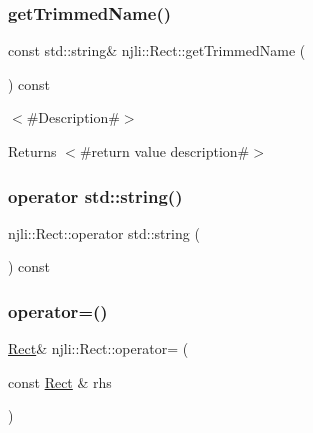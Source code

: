 \mbox{\label{classnjli_1_1_rect_a75997b34f04a294b72534d0c267ceb30}} 
\subsubsection{\texorpdfstring{get\+Trimmed\+Name()}{getTrimmedName()}}
{\footnotesize\ttfamily const std\+::string\& njli\+::\+Rect\+::get\+Trimmed\+Name (\begin{DoxyParamCaption}{ }\end{DoxyParamCaption}) const}

$<$\#\+Description\#$>$

\begin{DoxyReturn}{Returns}
$<$\#return value description\#$>$ 
\end{DoxyReturn}
\mbox{\label{classnjli_1_1_rect_ac0c7f6ed39d0448a6cd0e5c906a5596c}} 
\subsubsection{\texorpdfstring{operator std\+::string()}{operator std::string()}}
{\footnotesize\ttfamily njli\+::\+Rect\+::operator std\+::string (\begin{DoxyParamCaption}{ }\end{DoxyParamCaption}) const}

\mbox{\label{classnjli_1_1_rect_a7314f91fde16f316d58f65cf6fc7b15a}} 
\subsubsection{\texorpdfstring{operator=()}{operator=()}}
{\footnotesize\ttfamily \mbox{\hyperlink{classnjli_1_1_rect}{Rect}}\& njli\+::\+Rect\+::operator= (\begin{DoxyParamCaption}\item[{const \mbox{\hyperlink{classnjli_1_1_rect}{Rect}} \&}]{rhs }\end{DoxyParamCaption})}

